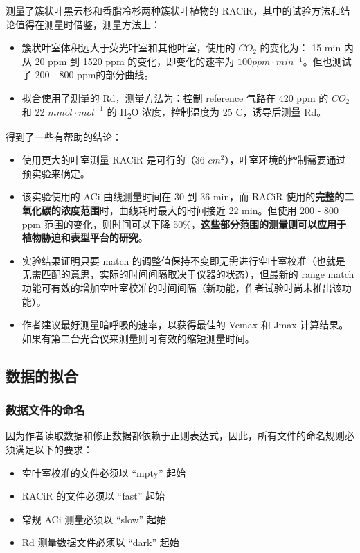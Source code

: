 \documentclass[
]{krantz}
\begin{document}
\citet{Coursolle12019} 测量了簇状叶黑云杉和香脂冷杉两种簇状叶植物的 RACiR，其中的试验方法和结论值得在测量时借鉴，测量方法上：

\begin{itemize}
\item
  簇状叶室体积远大于荧光叶室和其他叶室，使用的 \(CO_2\) 的变化为： 15 min 内从 20 ppm 到 1520 ppm 的变化，即变化的速率为 \(100 ppm \cdot min^{-1}\)。但也测试了 200 - 800 ppm的部分曲线。
\item
  拟合使用了测量的 Rd，测量方法为：控制 reference 气路在 420 ppm 的 \(CO_2\) 和 22 \(mmol \cdot mol^{-1}\) 的 H\textsubscript{2}O 浓度，控制温度为 25 C，诱导后测量 Rd。
\end{itemize}

得到了一些有帮助的结论：

\begin{itemize}
\item
  使用更大的叶室测量 RACiR 是可行的（36 \(cm^2\)），叶室环境的控制需要通过预实验来确定。
\item
  该实验使用的 ACi 曲线测量时间在 30 到 36 min，而 RACiR 使用的\textbf{完整的二氧化碳的浓度范围}时，曲线耗时最大的时间接近 22 min。但使用 200 - 800 ppm 范围的变化，则时间可以下降 50\%，\textbf{这些部分范围的测量则可以应用于植物胁迫和表型平台的研究}。
\item
  实验结果证明只要 match 的调整值保持不变即无需进行空叶室校准（也就是无需匹配的意思，实际的时间间隔取决于仪器的状态），但最新的 range match 功能可有效的增加空叶室校准的时间间隔（新功能，作者试验时尚未推出该功能）。
\item
  作者建议最好测量暗呼吸的速率，以获得最佳的 Vcmax 和 Jmax 计算结果。如果有第二台光合仪来测量则可有效的缩短测量时间。
\end{itemize}

\hypertarget{conifer-fit-racir}{%
\subsection{数据的拟合}\label{conifer-fit-racir}}

\hypertarget{name-files}{%
\subsubsection{数据文件的命名}\label{name-files}}

因为作者读取数据和修正数据都依赖于正则表达式，因此，所有文件的命名规则必须满足以下的要求：

\begin{itemize}
\item
  空叶室校准的文件必须以 ``mpty'' 起始
\item
  RACiR 的文件必须以 ``fast'' 起始
\item
  常规 ACi 测量必须以 ``slow'' 起始
\item
  Rd 测量数据文件必须以 ``dark'' 起始
\end{itemize}
\end{document}
